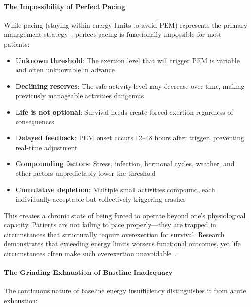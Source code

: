 \paragraph{The Impossibility of Perfect Pacing}

While pacing (staying within energy limits to avoid PEM) represents the primary management strategy~\cite{jason2012energy}, perfect pacing is functionally impossible for most patients:

\begin{itemize}
    \item \textbf{Unknown threshold}: The exertion level that will trigger PEM is variable and often unknowable in advance
    \item \textbf{Declining reserves}: The safe activity level may decrease over time, making previously manageable activities dangerous
    \item \textbf{Life is not optional}: Survival needs create forced exertion regardless of consequences
    \item \textbf{Delayed feedback}: PEM onset occurs 12--48 hours after trigger, preventing real-time adjustment
    \item \textbf{Compounding factors}: Stress, infection, hormonal cycles, weather, and other factors unpredictably lower the threshold
    \item \textbf{Cumulative depletion}: Multiple small activities compound, each individually acceptable but collectively triggering crashes
\end{itemize}

This creates a chronic state of being forced to operate beyond one's physiological capacity. Patients are not failing to pace properly---they are trapped in circumstances that structurally require overexertion for survival. Research demonstrates that exceeding energy limits worsens functional outcomes, yet life circumstances often make such overexertion unavoidable~\cite{jason2009energy,brown2011activity}.

\paragraph{The Grinding Exhaustion of Baseline Inadequacy}

The continuous nature of baseline energy insufficiency distinguishes it from acute exhaustion:

